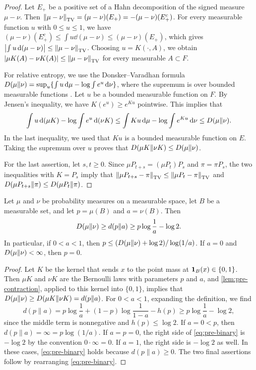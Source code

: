 \begin{proof}
Let $E_+$ be a positive set of a Hahn decomposition of the signed measure $\mu-\nu$. Then $\left\lVert\mu-\nu\right\rVert_{\mathrm{TV}}=(\mu-\nu)(E_+)=-(\mu-\nu)(E_+^c)$. For every measurable function $u$ with $0\le u\le1$, we have $(\mu-\nu)(E_+^c)\le\int u\dd(\mu-\nu)\le(\mu-\nu)(E_+)$, which gives $\left|\int u\,\mathrm d(\mu-\nu)\right|\le\left\lVert\mu-\nu\right\rVert_{\mathrm{TV}}$. Choosing $u=K(\cdot,A)$, we obtain $\left|\mu K(A)-\nu K(A)\right|\le\left\lVert\mu-\nu\right\rVert_{\mathrm{TV}}$ for every measurable $A\subset F$.

For relative entropy, we use the Donsker--Varadhan formula $D(\mu\|\nu)=\sup_u\{\int u\,\mathrm d\mu-\log\int e^u\,\mathrm d\nu\}$, where the supremum is over bounded measurable functions \cite[Theorem~4.6]{PolyanskiyWu2025}. Let $u$ be a bounded measurable function on $F$. By Jensen's inequality, we have $K(e^u)\ge e^{Ku}$ pointwise. This implies that
\[
\int u\,\mathrm d(\mu K)-\log\int e^u\,\mathrm d(\nu K)\le\int Ku\,\mathrm d\mu-\log\int e^{Ku}\,\mathrm d\nu\le D(\mu\|\nu).
\]
In the last inequality, we used that $Ku$ is a bounded measurable function on $E$. Taking the supremum over $u$ proves that $D(\mu K\|\nu K)\le D(\mu\|\nu)$.

For the last assertion, let $s,t\ge0$. Since $\mu P_{t+s}=(\mu P_t)P_s$ and $\pi=\pi P_s$, the two inequalities with $K=P_s$ imply that $\left\lVert\mu P_{t+s}-\pi\right\rVert_{\mathrm{TV}}\le\left\lVert\mu P_t-\pi\right\rVert_{\mathrm{TV}}$ and $D(\mu P_{t+s}\|\pi)\le D(\mu P_t\|\pi)$.
\end{proof}

\begin{lemma}\label{lem:pre-binary}
Let $\mu$ and $\nu$ be probability measures on a measurable space, let $B$ be a measurable set, and let $p=\mu(B)$ and $a=\nu(B)$. Then
\begin{equation}\label{eq:pre-binary}
D(\mu\|\nu)\ge d(p\|a)\ge p\log\frac1a-\log2.
\end{equation}
In particular, if $0<a<1$, then $p\le(D(\mu\|\nu)+\log2)/\log(1/a)$. If $a=0$ and $D(\mu\|\nu)<\infty$, then $p=0$.
\end{lemma}

\begin{proof}
Let $K$ be the kernel that sends $x$ to the point mass at $\mathbf 1_B(x)\in\{0,1\}$. Then $\mu K$ and $\nu K$ are the Bernoulli laws with parameters $p$ and $a$, and \cref{lem:pre-contraction}, applied to this kernel into $\{0,1\}$, implies that $D(\mu\|\nu)\ge D(\mu K\|\nu K)=d(p\|a)$. For $0<a<1$, expanding the definition, we find
\[
d(p\|a)=p\log\frac1a+(1-p)\log\frac1{1-a}-h(p)\ge p\log\frac1a-\log2,
\]
since the middle term is nonnegative and $h(p)\le\log2$. If $a=0<p$, then $d(p\|a)=\infty=p\log(1/a)$. If $a=p=0$, the right side of \eqref{eq:pre-binary} is $-\log2$ by the convention $0\cdot\infty=0$. If $a=1$, the right side is $-\log2$ as well. In these cases, \eqref{eq:pre-binary} holds because $d(p\|a)\ge0$. The two final assertions follow by rearranging \eqref{eq:pre-binary}.
\end{proof}

